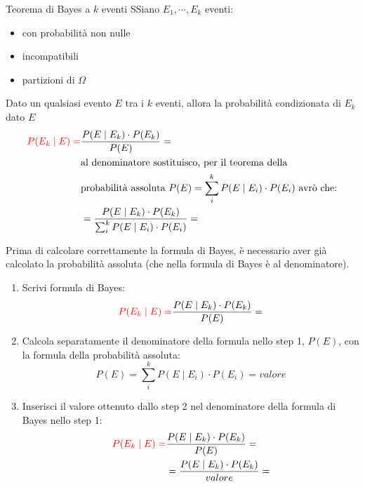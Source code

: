 \documentclass{article}  %
\theoremstyle{definition}
\begin{document}
\begin{theorem}{Teorema di Bayes a $k$ eventi}
	SSiano $E_1, \cdots, E_k$ eventi:
	\begin{itemize}
		\item con probabilità non nulle
		\item incompatibili
		\item partizioni di $\Omega$
	\end{itemize}
	Dato un qualsiasi evento $E$ tra i $k$ eventi, allora la probabilità condizionata di $E_k$ dato $E$
	\begin{align*}
		\textcolor{red}{P(E_k \mid E)=}
		 & \frac{P(E \mid E_k) \cdot P(E_k)}{P(E)}=                                                      \\
		 & \text{al denominatore sostituisco, per il teorema della}                                      \\
		 & \text{probabilità assoluta } P(E) = \sum_{i}^{k} P(E \mid E_i) \cdot P(E_i) \text{ avrò che:} \\
		 & = \frac{P(E \mid E_k) \cdot P(E_k)}{\sum_{i}^{k} P(E \mid E_i) \cdot P(E_i)} =
	\end{align*}
\end{theorem}
\begin{osservazioni}
	Prima di calcolare correttamente la formula di Bayes, è necessario aver già calcolato la probabilità assoluta (che nella formula di Bayes
	è al denominatore).
	\begin{enumerate}
		\item Scrivi formula di Bayes:
		      \[
			      \textcolor{red}{P(E_k \mid E)=}\frac{P(E \mid E_k) \cdot P(E_k)}{P(E)}=
		      \]
		\item Calcola separatamente il denominatore della formula nello step 1, $P(E)$, con la formula della probabilità assoluta:
		      \[
			      P(E) = \sum_{i}^{k} P(E \mid E_i) \cdot P(E_i)=valore
		      \]
		\item Inserisci il valore ottenuto dallo step 2 nel denominatore della formula di Bayes nello step 1:
		      \begin{align*}
			      \textcolor{red}{P(E_k \mid E)=}
			       & \frac{P(E \mid E_k) \cdot P(E_k)}{P(E)}=      \\
			       & = \frac{P(E \mid E_k) \cdot P(E_k)}{valore} =
		      \end{align*}
	\end{enumerate}
\end{osservazioni}
\end{document}
